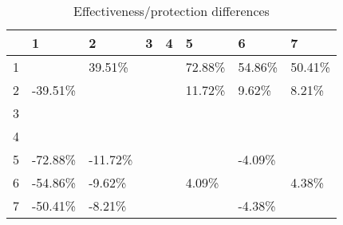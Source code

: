 \begin{table}[ht]
\centering
\begin{tabular}{rlllllll}
  \hline
 & 1 & 2 & 3 & 4 & 5 & 6 & 7 \\ 
  \hline
1 &  & 39.51\% &  &  & 72.88\% & 54.86\% & 50.41\% \\ 
  2 & -39.51\% &  &  &  & 11.72\% & 9.62\% & 8.21\% \\ 
  3 &  &  &  &  &  &  &  \\ 
  4 &  &  &  &  &  &  &  \\ 
  5 & -72.88\% & -11.72\% &  &  &  & -4.09\% &  \\ 
  6 & -54.86\% & -9.62\% &  &  & 4.09\% &  & 4.38\% \\ 
  7 & -50.41\% & -8.21\% &  &  &  & -4.38\% &  \\ 
   \hline
\end{tabular}
\caption{Effectiveness/protection differences} 
\end{table}
